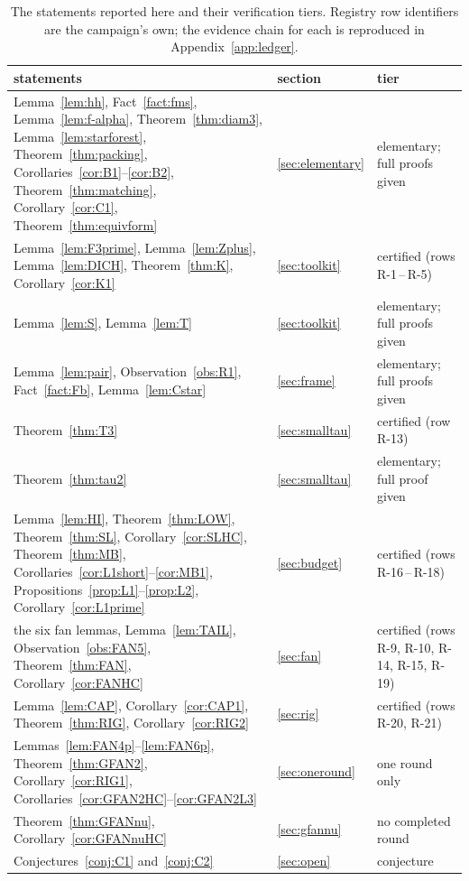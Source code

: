 \documentclass[11pt]{article}
\theoremstyle{plain}
\theoremstyle{definition}
\theoremstyle{remark}
\numberwithin{equation}{section}
\begin{document}
\begin{table}[t]
\centering
\small
\begin{tabular}{@{}p{}p{}p{}@{}}
\toprule
statements & section & tier \\
\midrule
Lemma~\ref{lem:hh}, Fact~\ref{fact:fms}, Lemma~\ref{lem:f-alpha},
Theorem~\ref{thm:diam3}, Lemma~\ref{lem:starforest},
Theorem~\ref{thm:packing}, Corollaries~\ref{cor:B1}--\ref{cor:B2},
Theorem~\ref{thm:matching}, Corollary~\ref{cor:C1}, Theorem~\ref{thm:equivform}
 & \ref{sec:elementary} & elementary; full proofs given \\
\addlinespace
Lemma~\ref{lem:F3prime}, Lemma~\ref{lem:Zplus}, Lemma~\ref{lem:DICH},
Theorem~\ref{thm:K}, Corollary~\ref{cor:K1}
 & \ref{sec:toolkit} & certified (rows R-1\,--\,R-5) \\
Lemma~\ref{lem:S}, Lemma~\ref{lem:T}
 & \ref{sec:toolkit} & elementary; full proofs given \\
Lemma~\ref{lem:pair}, Observation~\ref{obs:R1}, Fact~\ref{fact:Fb},
Lemma~\ref{lem:Cstar}
 & \ref{sec:frame} & elementary; full proofs given \\
Theorem~\ref{thm:T3}
 & \ref{sec:smalltau} & certified (row R-13) \\
Theorem~\ref{thm:tau2}
 & \ref{sec:smalltau} & elementary; full proof given \\
Lemma~\ref{lem:HI}, Theorem~\ref{thm:LOW}, Theorem~\ref{thm:SL},
Corollary~\ref{cor:SLHC}, Theorem~\ref{thm:MB},
Corollaries~\ref{cor:L1short}--\ref{cor:MB1},
Propositions~\ref{prop:L1}--\ref{prop:L2}, Corollary~\ref{cor:L1prime}
 & \ref{sec:budget} & certified (rows R-16\,--\,R-18) \\
the six fan lemmas, Lemma~\ref{lem:TAIL},
Observation~\ref{obs:FAN5}, Theorem~\ref{thm:FAN}, Corollary~\ref{cor:FANHC}
 & \ref{sec:fan} & certified (rows R-9, R-10, R-14, R-15, R-19) \\
Lemma~\ref{lem:CAP}, Corollary~\ref{cor:CAP1}, Theorem~\ref{thm:RIG},
Corollary~\ref{cor:RIG2}
 & \ref{sec:rig} & certified (rows R-20, R-21) \\
\addlinespace
Lemmas~\ref{lem:FAN4p}--\ref{lem:FAN6p}, Theorem~\ref{thm:GFAN2},
Corollary~\ref{cor:RIG1}, Corollaries~\ref{cor:GFAN2HC}--\ref{cor:GFAN2L3}
 & \ref{sec:oneround} & one round only \\
\addlinespace
Theorem~\ref{thm:GFANnu}, Corollary~\ref{cor:GFANnuHC}
 & \ref{sec:gfannu} & no completed round \\
\addlinespace
Conjectures~\ref{conj:C1} and~\ref{conj:C2}
 & \ref{sec:open} & conjecture \\
\bottomrule
\end{tabular}
\caption{The statements reported here and their verification tiers. Registry row
identifiers are the campaign's own; the evidence chain for each is reproduced in
Appendix~\ref{app:ledger}.}
\label{tab:summary}
\end{table}
\end{document}
